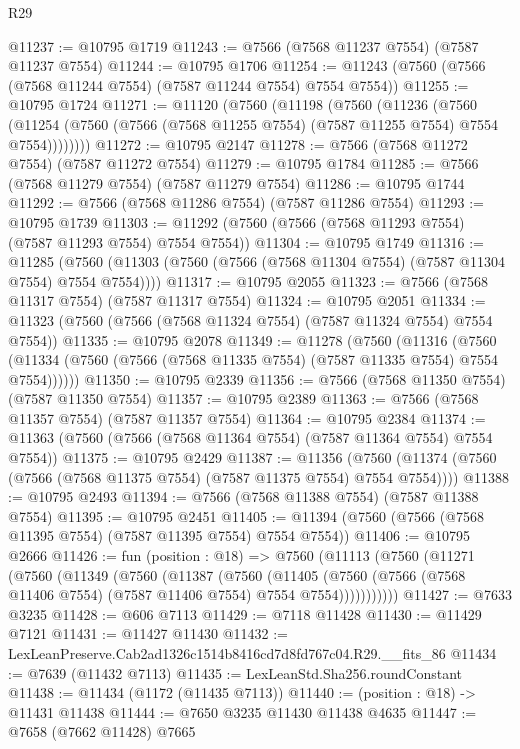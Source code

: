 \begin{lexlean}{R29}
\begin{coremodule}
@11237 := @10795 @1719
@11243 := @7566 (@7568 @11237 @7554) (@7587 @11237 @7554)
@11244 := @10795 @1706
@11254 := @11243 (@7560 (@7566 (@7568 @11244 @7554) (@7587 @11244 @7554) @7554 @7554))
@11255 := @10795 @1724
@11271 := @11120
    (@7560
      (@11198
        (@7560
          (@11236
            (@7560
              (@11254 (@7560 (@7566 (@7568 @11255 @7554) (@7587 @11255 @7554) @7554 @7554))))))))
@11272 := @10795 @2147
@11278 := @7566 (@7568 @11272 @7554) (@7587 @11272 @7554)
@11279 := @10795 @1784
@11285 := @7566 (@7568 @11279 @7554) (@7587 @11279 @7554)
@11286 := @10795 @1744
@11292 := @7566 (@7568 @11286 @7554) (@7587 @11286 @7554)
@11293 := @10795 @1739
@11303 := @11292 (@7560 (@7566 (@7568 @11293 @7554) (@7587 @11293 @7554) @7554 @7554))
@11304 := @10795 @1749
@11316 := @11285
    (@7560 (@11303 (@7560 (@7566 (@7568 @11304 @7554) (@7587 @11304 @7554) @7554 @7554))))
@11317 := @10795 @2055
@11323 := @7566 (@7568 @11317 @7554) (@7587 @11317 @7554)
@11324 := @10795 @2051
@11334 := @11323 (@7560 (@7566 (@7568 @11324 @7554) (@7587 @11324 @7554) @7554 @7554))
@11335 := @10795 @2078
@11349 := @11278
    (@7560
      (@11316
        (@7560 (@11334 (@7560 (@7566 (@7568 @11335 @7554) (@7587 @11335 @7554) @7554 @7554))))))
@11350 := @10795 @2339
@11356 := @7566 (@7568 @11350 @7554) (@7587 @11350 @7554)
@11357 := @10795 @2389
@11363 := @7566 (@7568 @11357 @7554) (@7587 @11357 @7554)
@11364 := @10795 @2384
@11374 := @11363 (@7560 (@7566 (@7568 @11364 @7554) (@7587 @11364 @7554) @7554 @7554))
@11375 := @10795 @2429
@11387 := @11356
    (@7560 (@11374 (@7560 (@7566 (@7568 @11375 @7554) (@7587 @11375 @7554) @7554 @7554))))
@11388 := @10795 @2493
@11394 := @7566 (@7568 @11388 @7554) (@7587 @11388 @7554)
@11395 := @10795 @2451
@11405 := @11394 (@7560 (@7566 (@7568 @11395 @7554) (@7587 @11395 @7554) @7554 @7554))
@11406 := @10795 @2666
@11426 := fun (position : @18) =>
  @7560
    (@11113
      (@7560
        (@11271
          (@7560
            (@11349
              (@7560
                (@11387
                  (@7560
                    (@11405
                      (@7560 (@7566 (@7568 @11406 @7554) (@7587 @11406 @7554) @7554 @7554)))))))))))
@11427 := @7633 @3235
@11428 := @606 @7113
@11429 := @7118 @11428
@11430 := @11429 @7121
@11431 := @11427 @11430
@11432 := LexLeanPreserve.Cab2ad1326c1514b8416cd7d8fd767c04.R29.__fits_86
@11434 := @7639 (@11432 @7113)
@11435 := LexLeanStd.Sha256.roundConstant
@11438 := @11434 (@1172 (@11435 @7113))
@11440 := (position : @18) -> @11431 @11438
@11444 := @7650 @3235 @11430 @11438 @4635
@11447 := @7658 (@7662 @11428) @7665

\end{coremodule}
\end{lexlean}

